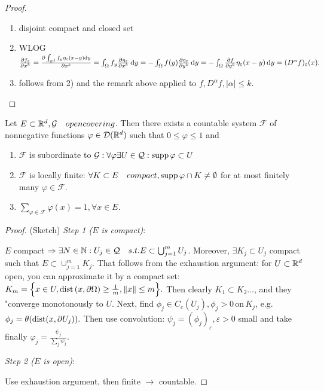 \documentclass{article}
\begin{document}
\begin{proof}
	\begin{enumerate}
		\item disjoint compact and closed set
		\item WLOG $\pdv{f_{\varepsilon}}{x^k} = \pdv{\int_{\ensuremath{{\mathbb R}}^d}f_y \eta_{\varepsilon}(x-y)\dd{y}}{x^k} = \int_{\Omega}f_y \pdv{\eta_{\varepsilon}}{x^k}(x-y)\dd{y} = - \int_{\Omega}f(y)\pdv{\eta_{\varepsilon}}{y^k}(x-y)\dd{y} =  - \int_{\Omega}\pdv{f}{y^k}\eta_{\varepsilon}(x-y)\dd{y} = (D^\alpha f)_{\varepsilon}(x).$
		\item follows from 2) and the remark above applied to $f, D^\alpha f, |\alpha| \leq k$.
	\end{enumerate}
\end{proof}
%

\begin{lemma}
	Let $E \subset {\mathbb R}^d, \mathcal{G} \quad{open covering}$. Then there exists a countable system $\mathcal{F}$ of nonnegative functions $\varphi \in \mathcal{D}({\mathbb R}^d)$ such that $0 \leq \varphi \leq 1$ and 
	\begin{enumerate}
		\item $\mathcal{F}$ is subordinate to $\mathcal{G}: \forall \varphi \exists U \in \mathcal{Q}: \operatorname{supp} \varphi \subset U$
		\item $\mathcal{F}$ is locally finite: $\forall K \subset E \quad{compact}, \operatorname{supp} \varphi \cap K \neq \emptyset$ for at most finitely many $\varphi \in \mathcal{F}$.
		\item $\sum_{\varphi \in \mathcal{F}} \varphi(x) = 1, \forall x \in E$.
	\end{enumerate}
\end{lemma}
\begin{proof}
	(Sketch)
\textit{Step 1 ($E$ is compact)}:

$E$ compact $\Rightarrow \exists N \in {\mathbb N}: U_j \in \mathcal{Q} \quad{s.t.} E \subset \bigcup_{j=1}^{m}U_j$. Moreover, $\exists K_j \subset U_j$ compact such that $E \subset \cup_{j=1}^m K_j$. That follows from the exhaustion argument: for $U \subset {\mathbb R}^d$ open, you can approximate it by a compact set: $K_m = \Big\{x \in U, \operatorname{dist}\qty(x,\partial \Omega) \geq \frac{1}{m}, \norm{x} \leq m \Big\}.$ Then clearly $K_1 \subset K_2 \dots $, and they "converge monotonously to $U$.
Next, find $\phi_j \in C_c(U_j), \phi_j >0 \, \text{on} \, K_j$, e.g. $\phi_j = \theta\qty(\operatorname{dist}(x,\partial U_j)).$ Then use convolution: $\psi_j = (\phi_j)_{\varepsilon}, \varepsilon > 0$ small and take finally $\varphi_j = \frac{\psi_j}{\sum_j \psi_j}$.

\textit{Step 2 ($E$ is open)}:

Use exhaustion argument, then finite $\to$ countable.
\end{proof}
\end{document}
